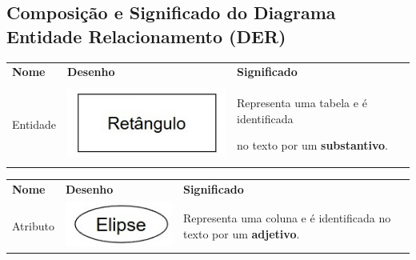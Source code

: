\documentclass[
]{book}
\begin{document}
\subsection{Composição e Significado do Diagrama Entidade Relacionamento (DER)}\label{composiuxe7uxe3o-e-significado-do-diagrama-entidade-relacionamento-der}

\begin{longtable}[]{@{}
  >{\centering\arraybackslash}p{}
  >{\centering\arraybackslash}p{}
  >{\centering\arraybackslash}p{}@{}}
\toprule\noalign{}
\endhead
\bottomrule\noalign{}
\endlastfoot
\textbf{Nome} & \textbf{Desenho} & \textbf{Significado} \\
Entidade & \includegraphics{images/5-bi/03-retangulo.jpg} & Representa uma tabela e é identificada

no texto por um \textbf{substantivo}. \\
\end{longtable}

\begin{longtable}[]{@{}
  >{\centering\arraybackslash}p{}
  >{\centering\arraybackslash}p{}
  >{\centering\arraybackslash}p{}@{}}
\toprule\noalign{}
\endhead
\bottomrule\noalign{}
\endlastfoot
\textbf{Nome} & \textbf{Desenho} & \textbf{Significado} \\
Atributo & \includegraphics[width=1.89583in,height=\textheight]{images/5-bi/05-elipse.jpg} & Representa uma coluna e é identificada no texto por um \textbf{adjetivo}. \\
\end{longtable}
\end{document}
